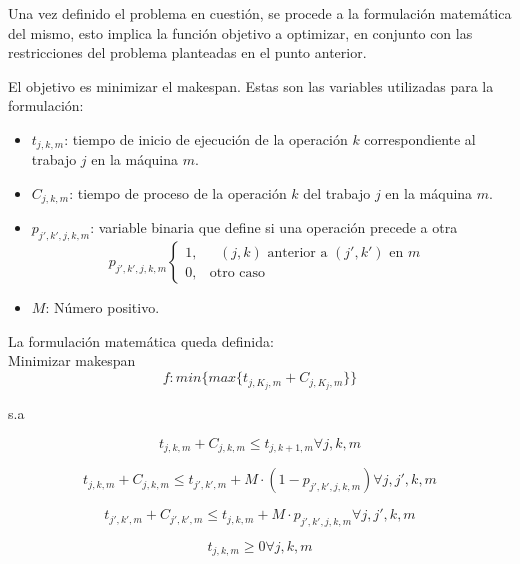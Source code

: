 \documentclass[journal]{IEEEtran}
\begin{document}
Una vez definido el problema en cuestión, se procede a la formulación matemática del mismo, esto implica la función objetivo a optimizar, en conjunto con las restricciones del problema planteadas en el punto anterior.

El objetivo es minimizar el makespan. Estas son las variables utilizadas para la formulación:
\begin{itemize}
  \item $t_{j,k,m}$: tiempo de inicio de ejecución de la operación $k$ correspondiente al trabajo $j$ en la máquina $m$.
  \item $C_{j,k,m}$: tiempo de proceso de la operación $k$ del trabajo $j$ en la máquina $m$.
  \item $p_{j',k',j,k,m}$: variable binaria que define si una operación precede a otra \[
p_{j',k',j,k,m}
\begin{cases}
    1,& \text{ $(j,k)$ anterior a $(j',k')$ en $m$ } \\
    0,              & \text{otro caso}
\end{cases}
\]

\item $M$: Número positivo.
\end{itemize}


La formulación matemática queda definida:\\

Minimizar makespan
\begin{equation}
\label{eq1}
  f: min \{ max\{t_{j,K_{j},m}+C_{j,K_{j},m}\} \}
\end{equation}

s.a

\begin{equation}
\label{eq2}
  t_{j,k,m} + C_{j,k,m} \leq t_{j,k+1,m} \forall j,k,m
\end{equation}


\begin{equation}
\label{eq4}
   t_{j,k,m} + C_{j,k,m} \leq t_{j',k',m} + M \cdot (1- p_{j',k',j,k,m}) \forall j,j',k,m
\end{equation}

\begin{equation}
\label{eq5}
   t_{j',k',m} + C_{j',k',m} \leq t_{j,k,m} + M \cdot p_{j',k',j,k,m} \forall j,j',k,m
\end{equation}

\begin{equation}
\label{eq6}
  t_{j,k,m} \geq 0   \forall j,k,m
\end{equation}
\end{document}

